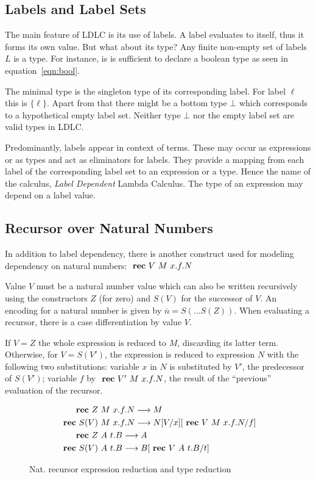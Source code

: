 \subsection{Labels and Label Sets}

The main feature of LDLC is its use of labels. A label evaluates to itself, thus it forms its own value. But what about its type? Any finite non-empty set of labels $L$ is a type. For instance, is is sufficient to declare a boolean type as seen in equation~\ref{eqn:bool}.

The minimal type is the singleton type of its corresponding label. For label $\ell$ this is $\{\ell\}$. Apart from that there might be a bottom type $\bot$ which corresponds to a hypothetical empty label set. Neither type $\bot$ nor the empty label set are valid types in LDLC.

Predominantly, labels appear in context of \case terms. These may occur as expressions or as types and act as eliminators for labels. They provide a mapping from each label of the corresponding label set to an expression or a type. Hence the name of the calculus, \emph{Label Dependent} Lambda Calculus. The type of an expression may depend on a label value.

\subsection{Recursor over Natural Numbers}\label{sec:ldgv-recursor}

In addition to label dependency, there is another construct used for modeling dependency on natural numbers: $\text{ \textbf{rec} } V~M~x.f.N$

Value $V$ must be a natural number value which can also be written recursively using the constructors $Z$ (for zero) and $S(V)$ for the successor of $V$. An encoding for a natural number is given by $\overline{n} = S(\dots S(Z))$. When evaluating a recursor, there is a case differentiation by value $V$.

If $V=Z$ the whole expression is reduced to $M$, discarding its latter term. Otherwise, for $V=S(V')$, the \rec expression is reduced to expression $N$ with the following two substitutions: variable $x$ in $N$ is substituted by $V'$, the predecessor of $S(V')$; variable $f$ by $\text{ \textbf{rec} } V'~M~x.f.N$, the result of the ``previous'' evaluation of the recursor.

\begin{figure}
 \begin{align*}
 \text{ \textbf{rec} } Z~&M~x.f.N \longrightarrow M \\
 \text{ \textbf{rec} } S(V)~&M~x.f.N \longrightarrow N [V/x] [\text{ \textbf{rec} } V~M~x.f.N/f] \\
 \text{ \textbf{rec} } Z~&A~t.B \longrightarrow A \\
 \text{ \textbf{rec} } S(V)~&A~t.B \longrightarrow B [\text{ \textbf{rec} } V~A~t.B/t]
\end{align*}
\caption{Nat. recursor expression reduction and type reduction}
\label{fig:ldlc-rec-exp}
\end{figure}


